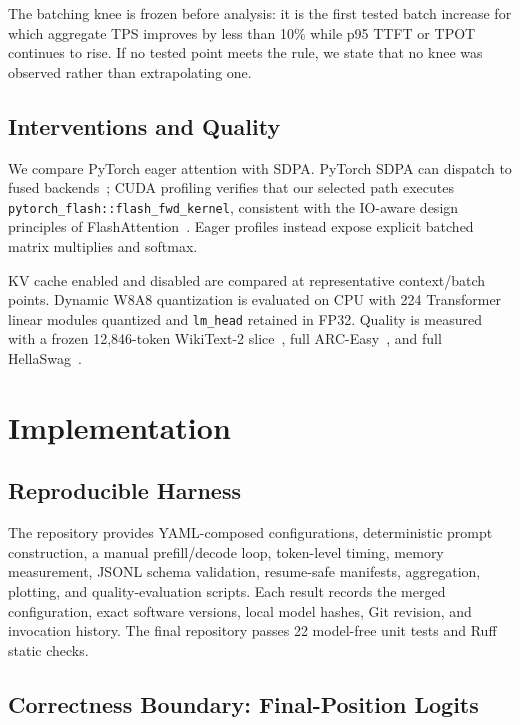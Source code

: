 \documentclass[conference]{IEEEtran}
\begin{document}
The batching knee is frozen before analysis: it is the first tested batch
increase for which aggregate TPS improves by less than 10\% while p95 TTFT
or TPOT continues to rise. If no tested point meets the rule, we state that
no knee was observed rather than extrapolating one.

\subsection{Interventions and Quality}

We compare PyTorch eager attention with SDPA. PyTorch SDPA can dispatch to
fused backends~\cite{pytorch_sdpa}; CUDA profiling verifies that our selected
path executes \texttt{pytorch\_flash::flash\_fwd\_kernel}, consistent with
the IO-aware design principles of FlashAttention~\cite{flashattention}.
Eager profiles instead expose explicit batched matrix multiplies and
softmax.

KV cache enabled and disabled are compared at representative context/batch
points. Dynamic W8A8 quantization is evaluated on CPU with 224 Transformer
linear modules quantized and \texttt{lm\_head} retained in FP32. Quality is
measured with a frozen 12,846-token WikiText-2 slice~\cite{wikitext}, full
ARC-Easy~\cite{arc}, and full HellaSwag~\cite{hellaswag}.

\section{Implementation}

\subsection{Reproducible Harness}

The repository provides YAML-composed configurations, deterministic prompt
construction, a manual prefill/decode loop, token-level timing, memory
measurement, JSONL schema validation, resume-safe manifests, aggregation,
plotting, and quality-evaluation scripts. Each result records the merged
configuration, exact software versions, local model hashes, Git revision,
and invocation history. The final repository passes 22 model-free unit tests
and Ruff static checks.

\subsection{Correctness Boundary: Final-Position Logits}
\end{document}
